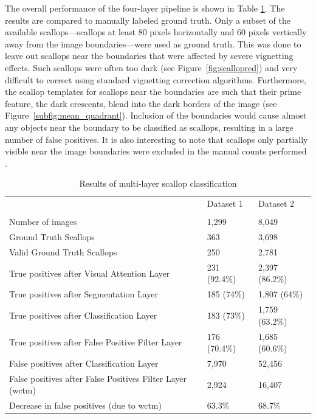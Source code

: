 \documentclass {udthesis}
\begin{document}
The overall performance of the four-layer pipeline is shown in Table \ref{tab:count_results}.  
The results are compared to manually labeled ground truth.
Only a subset of the available scallops---scallops at least 80 pixels horizontally and 60 pixels vertically away from the image boundaries---were used as ground truth.
This was done to leave out scallops near the boundaries that were affected by severe vignetting effects. 
Such scallops were often too dark (see Figure~\ref{fig:scallopred}) and very difficult to correct using standard vignetting correction algorithms.
Furthermore, the scallop templates for scallops near the boundaries are such that their prime feature, the dark crescents, blend into the dark borders of the image (see Figure~\ref{subfig:mean_quadrant}). 
Inclusion of the boundaries would cause almost any objects near the boundary to be classified as scallops, resulting in a large number of false positives.
It is also interesting to note that scallops only partially visible near the image boundaries were excluded in the manual counts performed \cite{walker}.

\begin{table}
\caption{Results of multi-layer scallop classification \label{tab:count_results}}
\begin{center}
\begin{tabular}{lll}
\toprule[1pt]
 & Dataset 1 & Dataset 2\\[2pt]\cline{1-3}\\[-5pt]
Number of images & 1,299 & 8,049\\
Ground Truth Scallops & 363 & 3,698\\
Valid Ground Truth Scallops & 250 & 2,781\\
True positives after Visual Attention Layer & 231 (92.4\%) & 2,397 (86.2\%)\\
True positives after Segmentation Layer & 185 (74\%) & 1,807 (64\%)\\
True positives after Classification Layer & 183 (73\%) & 1,759 (63.2\%)\\
True positives after False Positive Filter Layer & 176 (70.4\%) & 1,685 (60.6\%)\\
False positives after Classification Layer & 7,970 & 52,456\\
False positives after False Positives Filter Layer (\gls{wctm}) & 2,924 & 16,407\\
Decrease in false positives (due to \gls{wctm}) & 63.3\% & 68.7\%\\ \bottomrule
                               \end{tabular}
                               \end{center}
                               \end{table}      
   
\end{document}
